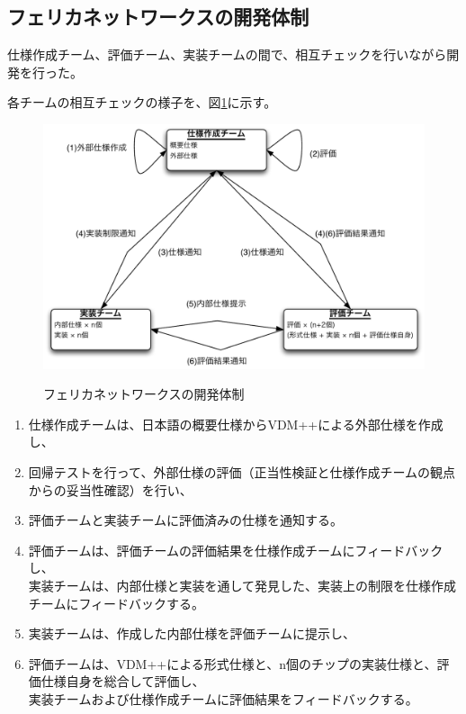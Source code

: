 \subsection{フェリカネットワークスの開発体制}

	仕様作成チーム、評価チーム、実装チームの間で、相互チェックを行いながら開発を行った。

	各チームの相互チェックの様子を、図\ref{fig:FeliCaTeamStructure}に示す。

\begin{figure}[h]
	\centering
	{\includegraphics[width=55zw, keepaspectratio]{./Chapter4/image/FeliCaTeam.pdf}}
	\caption{フェリカネットワークスの開発体制}
	\label{fig:FeliCaTeamStructure}
\end{figure}

\begin{enumerate}
	\item 仕様作成チームは、日本語の概要仕様からVDM++による外部仕様を作成し、
	\item 回帰テストを行って、外部仕様の評価（正当性検証と仕様作成チームの観点からの妥当性確認）を行い、
	\item 評価チームと実装チームに評価済みの仕様を通知する。
	\item 評価チームは、評価チームの評価結果を仕様作成チームにフィードバックし、\\
		実装チームは、内部仕様と実装を通して発見した、実装上の制限を仕様作成チームにフィードバックする。
	\item 実装チームは、作成した内部仕様を評価チームに提示し、
	\item 評価チームは、VDM++による形式仕様と、n個のチップの実装仕様と、評価仕様自身を総合して評価し、\\
		実装チームおよび仕様作成チームに評価結果をフィードバックする。
\end{enumerate}

	
